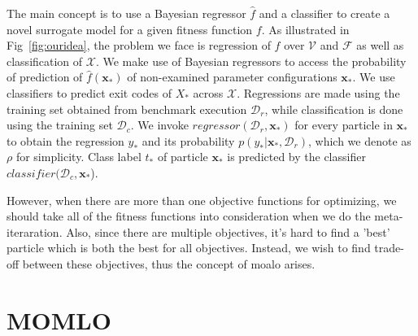 \documentclass[12pt, runningheads,a4paper]{llncs}
\begin{document}
The main concept is to use a Bayesian regressor $\hat{f}$ and a classifier to create a novel surrogate model for a given fitness function $f$. As illustrated in Fig~\ref{fig:ouridea}, the problem we face is regression of $f$ over $\mathcal{V}$ and $\mathcal{F}$ as well as classification of $\mathcal{X}$. We make use of Bayesian regressors to access the probability of prediction of $\hat{f}(\mathbf{x_*})$ of non-examined parameter configurations $\mathbf{x_*}$. We use classifiers to predict exit codes of $X_*$ across $\mathcal{X}$. Regressions are made using the training set obtained from benchmark execution $\mathcal{D}_{r}$, while classification is done using the training set $\mathcal{D}_{c}$. We invoke $regressor(\mathcal{D}_{r},\mathbf{x_*})$ for every particle in $\mathbf{x_*}$ to obtain the regression $y_*$ and its probability $p(y_* | \mathbf{x_*},\mathcal{D}_{r})$, which we denote as $\rho$ for simplicity. Class label $t_*$ of particle $\mathbf{x_*}$ is predicted by the classifier $classifier(\mathcal{D}_{c},\mathbf{x_*}$). 


%

However, when there are more than one objective functions for optimizing, we should take all of the fitness functions into consideration when we do the meta-iteraration. Also, since there are multiple objectives, it's hard to find a 'best' particle which is both the best for all objectives. Instead, we wish to find trade-off between these objectives, thus the concept of \ac{moalo} arises. 



%
\section{MOMLO}
\end{document}
